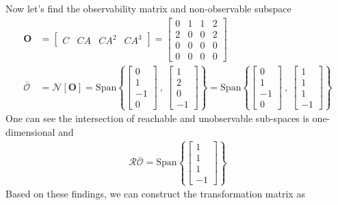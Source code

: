 \documentclass[twoside]{article}
\begin{document}
%
Now let's find the observability matrix and non-observable subspace
%
%
\begin{align*}
    \mathbf{O} &= \left[ \begin{array}{cccc} C & C A & C A^2 & C A^3 \end{array} \right] 
    =
    \left[ \begin{array}{cccc} 0 & 1 & 1 & 2 \\ 
    2 & 0 & 0 & 2 \\ 
    0 & 0 & 0 & 0 \\ 
    0 & 0 & 0 & 0 
    \end{array} \right] 
    \\
    \bar{\mathcal{O}} &= \mathcal{N}[ \mathbf{O} ] = \mathrm{Span} \left\lbrace 
    \left[ \begin{array}{c} 0 \\  1 \\  -1 \\  0  \end{array} \right] 
    \ , \
    \left[ \begin{array}{c} 1 \\  2 \\  0 \\  -1  \end{array} \right] 
    \right\rbrace = \mathrm{Span} \left\lbrace 
    \left[ \begin{array}{c} 0 \\  1 \\  -1 \\  0  \end{array} \right] 
    \ , \
    \left[ \begin{array}{c} 1 \\  1 \\  1 \\  -1  \end{array} \right] \right\rbrace 
\end{align*}
%
One can see the intersection of reachable and unobservable sub-spaces 
is one-dimensional and 
%
\begin{align*}
    \mathcal{R}\bar{\mathcal{O}} = \mathrm{Span} \left\lbrace 
    \left[ \begin{array}{c} 1 \\  1 \\  1 \\  -1  \end{array} \right] \right\rbrace 
\end{align*}
%
Based on these findings, we can construct the transformation matrix as
\end{document}
